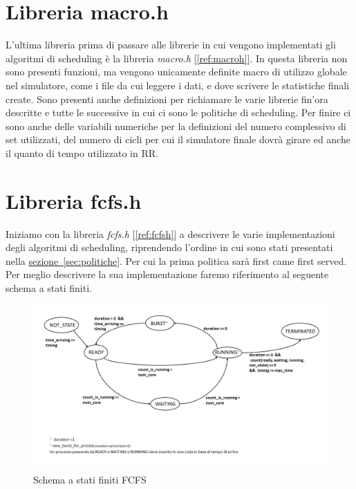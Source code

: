 \documentclass[Lau, oneside]{sapthesis}%
\begin{document}
\section{Libreria macro.h}
\label{sec:macro.h}
L'ultima libreria prima di passare alle librerie in cui vengono implementati gli algoritmi di scheduling è la libreria \textit{macro.h} \hyperref[ref:macroh]{[\ref*{ref:macroh}]}.
In questa libreria non sono presenti funzioni, ma vengono unicamente definite macro di utilizzo globale nel simulatore, come i file da cui leggere i dati, e dove scrivere le statistiche finali create.
Sono presenti anche definizioni per richiamare le varie librerie fin'ora descritte e tutte le successive in cui ci sono le politiche di scheduling.
Per finire ci sono anche delle variabili numeriche per la definizioni del numero complessivo di set utilizzati, del numero di cicli per cui il simulatore finale dovrà girare ed anche il quanto di tempo utilizzato in RR.

\section{Libreria fcfs.h}
\label{sec:fcfs.h}
Iniziamo con la libreria \textit{fcfs.h} \hyperref[ref:fcfsh]{[\ref*{ref:fcfsh}]} a descrivere le varie implementazioni degli algoritmi di scheduling, riprendendo l'ordine in cui sono stati presentati nella \hyperref[sec:politiche]{sezione~\ref*{sec:politiche}}.
Per cui la prima politica sarà first came first served.
Per meglio descrivere la sua implementazione faremo riferimento al seguente schema a stati finiti.
\begin{figure}[h]
  \centering
  \includegraphics[width=1\textwidth]{schema a stati finiti FCFS.JPG}
  \caption{Schema a stati finiti FCFS}
\end{figure}
\end{document}
